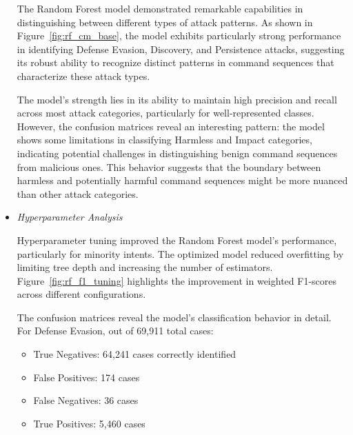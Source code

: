 \begin{itemize}
                    
                    The Random Forest model demonstrated remarkable capabilities in distinguishing between different types of attack patterns. As shown in Figure~\ref{fig:rf_cm_base}, the model exhibits particularly strong performance in identifying Defense Evasion, Discovery, and Persistence attacks, suggesting its robust ability to recognize distinct patterns in command sequences that characterize these attack types.
            
                    The model's strength lies in its ability to maintain high precision and recall across most attack categories, particularly for well-represented classes. However, the confusion matrices reveal an interesting pattern: the model shows some limitations in classifying Harmless and Impact categories, indicating potential challenges in distinguishing benign command sequences from malicious ones. This behavior suggests that the boundary between harmless and potentially harmful command sequences might be more nuanced than other attack categories.


                \vspace{0.5em}

                \item \textit{Hyperparameter Analysis}
                
                    \vspace{0.3em}
                    

                    Hyperparameter tuning improved the Random Forest model's performance, particularly for minority intents. The optimized model reduced overfitting by limiting tree depth and increasing the number of estimators. Figure~\ref{fig:rf_f1_tuning} highlights the improvement in weighted F1-scores across different configurations.
                    
                    
                    The confusion matrices reveal the model's classification behavior in detail. For Defense Evasion, out of 69,911 total cases:
                    
                    \begin{itemize}
                        \item True Negatives: 64,241 cases correctly identified
                        \item False Positives: 174 cases
                        \item False Negatives: 36 cases
                        \item True Positives: 5,460 cases
                    \end{itemize}


\end{itemize}
